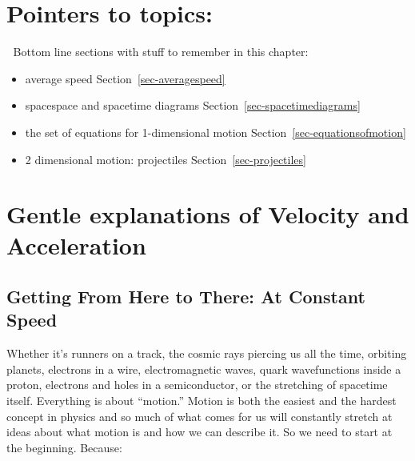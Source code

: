 \documentclass[
  letterpaper,
  DIV=11,
  numbers=noendperiod,
  oneside]{scrreprt}
\begin{document}
\section{Pointers to topics:}\label{pointers-to-topics}

\begin{tcolorbox}[enhanced jigsaw, toprule=.15mm, opacityback=0, colframe=quarto-callout-tip-color-frame, rightrule=.15mm, coltitle=black, bottomtitle=1mm, colbacktitle=quarto-callout-tip-color!10!white, bottomrule=.15mm, toptitle=1mm, titlerule=0mm, title={Tip}, arc=.35mm, leftrule=.75mm, left=2mm, colback=white, breakable, opacitybacktitle=0.6]

🔐 Bottom line sections with stuff to remember in this chapter:

\begin{itemize}
\item
  average speed Section~\ref{sec-averagespeed}
\item
  spacespace and spacetime diagrams Section~\ref{sec-spacetimediagrams}
\item
  the set of equations for 1-dimensional motion
  Section~\ref{sec-equationsofmotion}
\item
  2 dimensional motion: projectiles Section~\ref{sec-projectiles}
\end{itemize}

\end{tcolorbox}

\section{Gentle explanations of Velocity and
Acceleration}\label{gentle-explanations-of-velocity-and-acceleration}

\subsection{Getting From Here to There: At Constant
Speed}\label{getting-from-here-to-there-at-constant-speed}

Whether it's runners on a track, the cosmic rays piercing us all the
time, orbiting planets, electrons in a wire, electromagnetic waves,
quark wavefunctions inside a proton, electrons and holes in a
semiconductor, or the stretching of spacetime itself. Everything is
about ``motion.'' Motion is both the easiest and the hardest concept in
physics and so much of what comes for us will constantly stretch at
ideas about what motion is and how we can describe it. So we need to
start at the beginning. Because:
\end{document}
